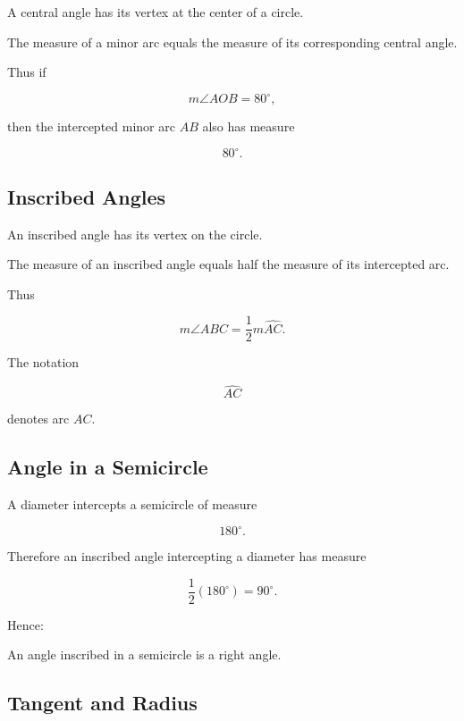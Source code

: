A central angle has its vertex at the center of a circle.

The measure of a minor arc equals the measure of its corresponding central
angle.

Thus if

\[ m\angle AOB=80^\circ, \]

then the intercepted minor arc \(AB\) also has measure

\[ 80^\circ. \]

\subsection{Inscribed Angles}
\label{subsec:inscribed-angles}

An inscribed angle has its vertex on the circle.

\begin{theorem}
The measure of an inscribed angle equals half the measure of its intercepted
arc.
\end{theorem}

Thus

\[ \boxed{m\angle ABC=\frac12m\widehat{AC}.} \]

The notation

\[ \widehat{AC} \]

denotes arc \(AC\).

\subsection{Angle in a Semicircle}
\label{subsec:angle-semicircle}

A diameter intercepts a semicircle of measure

\[ 180^\circ. \]

Therefore an inscribed angle intercepting a diameter has measure

\[ \frac12(180^\circ)=90^\circ. \]

Hence:

\begin{theorem}
An angle inscribed in a semicircle is a right angle.
\end{theorem}

\subsection{Tangent and Radius}
\label{subsec:tangent-radius}

